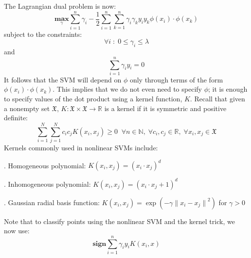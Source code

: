 \documentclass[11pt]{article}
\begin{document}
The Lagrangian dual problem is now:
\begin{equation} \label{eq1}
\underset{\gamma}{\mathbf{max}} \sum_{i=1}^n \gamma_i - \frac{1}{2} \sum_{i=1}^n \sum_{k=1}^n \gamma_i \gamma_k y_i y_k \phi \left( x_i \right) \cdot \phi \left( x_k \right)
\end{equation}
subject to the constraints:
\begin{equation} \label{eq1}
\forall i \; : \; 0 \leq \gamma_i \leq \lambda
\end{equation}
and
\begin{equation} \label{eq1}
\sum_{i=1}^n \gamma_i y_i = 0
\end{equation}
It follows that the SVM will depend on $\phi$ only through terms of the form $\phi \left( x_i \right) \cdot \phi \left( x_k \right)$. This implies that we do not even need to specify $\phi$; it is enough to specify values of the dot product using a kernel function, $K$. Recall that given a nonempty set $\mathfrak{X}$, $K : \mathfrak{X} \times \mathfrak{X} \rightarrow \mathbb{R}$ is a kernel if it is symmetric and positive definite:
\begin{equation} \label{eq1}
\sum_{i=1}^N \sum_{j=1}^N c_i c_j K \left( x_i ,x_j \right) \geq 0 \; \; \forall n \in \mathbb{N}, \; \forall c_i,c_j \in \mathbb{R}, \; \forall x_i, x_j \in \mathfrak{X}
\end{equation}
Kernels commonly used in nonlinear SVMs include:

. Homogeneous polynomial: $K \left( x_i, x_j \right) = {\left( x_i \cdot x_j \right)}^d$

. Inhomogeneous polynomial: $K \left( x_i, x_j \right) = {\left( x_i \cdot x_j + 1 \right)}^d$

. Gaussian radial basis function: $K \left( x_i , x_j \right) = \exp \left( - \gamma {\| x_i - x_j \|}^2 \right)$ for $\gamma > 0$

\noindent
Note that to classify points using the nonlinear SVM and the kernel trick, we now use:
\begin{equation} \label{eqNonlinearClass}
\mathbf{sign} \sum_{i=1}^n \gamma_i y_i K \left( x_i , x \right)
\end{equation}
\end{document}
